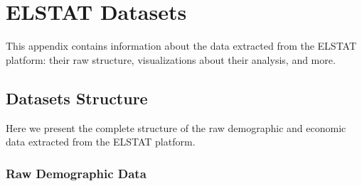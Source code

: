 \newpage
\section{ELSTAT Datasets}

This appendix contains information about the data extracted from the ELSTAT platform: their raw structure, visualizations about their analysis, and more.

\subsection{Datasets Structure}

Here we present the complete structure of the raw demographic and economic data extracted from the ELSTAT platform.


\subsubsection{Raw Demographic Data}

